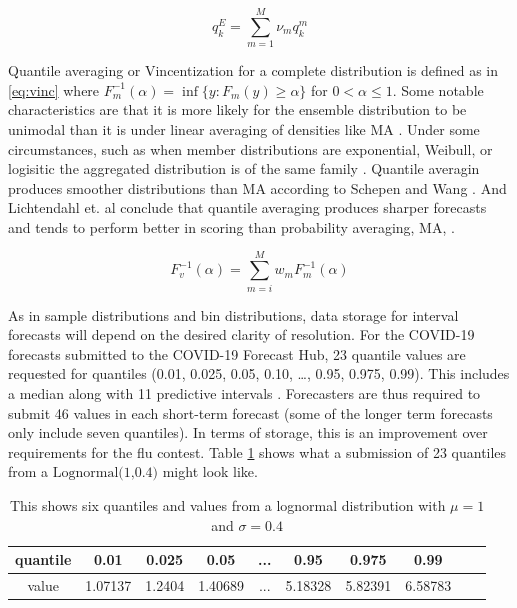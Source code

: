 \documentclass[11pt,notitlepage]{isuthesis}
\begin{document}
\begin{equation}
\label{eq:qa}
  q^E_k = \sum_{m=1}^M \nu_m q_k^m 
\end{equation}



Quantile averaging or Vincentization for a complete distribution is defined as
in \eqref{eq:vinc}
where $F_m^{-1} (\alpha) = \inf \{y:F_m(y) \geq \alpha\}$ for 
$0 < \alpha \leq 1$. Some notable characteristics are that it is more likely for
the ensemble distribution
to be unimodal than it is under linear averaging of densities like MA 
\cite[]{busetti2017quantile}. Under some circumstances, such as when member
distributions are exponential, Weibull, or logisitic the aggregated distribution
is of the same family \cite[]{ratcliff1979group}. Quantile averagin produces 
smoother
distributions than MA according to Schepen and Wang \cite[]{schepen2015model}.
And Lichtendahl et. al conclude that quantile averaging produces sharper 
forecasts
and tends to perform better in scoring than probability averaging, MA,
\cite[]{lichtendahl2013better}.

\begin{equation}
\label{eq:vinc}
  F_v^{-1}(\alpha) = \sum_{m=i}^M w_m F_m^{-1} (\alpha)
\end{equation}


As in sample distributions and bin distributions, 
data storage for interval forecasts will
depend on the desired clarity of resolution. For the COVID-19 forecasts 
submitted to the COVID-19 Forecast Hub, 23 quantile values are requested for 
quantiles (0.01, 0.025, 0.05, 0.10, …, 0.95, 0.975, 0.99). This includes a 
median along with 11 predictive intervals \cite[]{bracher2021evaluating}. 
Forecasters are thus required to submit 46 values in each short-term forecast 
(some of the longer term forecasts only include seven quantiles). In terms of 
storage, this is an improvement over requirements for the flu contest. Table
\ref{table:qstor} shows what a submission of 23 quantiles from a 
$\mbox{Lognormal(1,0.4)}$ might look like.



\begin{table}[h!]
\centering
\begin{center}

\captionsetup{font=scriptsize}

 \begin{tabular}{|c||c|c|c|c|c|c|c|c|c|}
 \hline
    quantile & 0.01 & 0.025 & 0.05  & ...  & 0.95 & 0.975 & 0.99 \\ \hline
    value & 1.07137 & 1.2404 & 1.40689 & ... & 5.18328 &
    5.82391 & 6.58783 \\
    
 \hline
 \end{tabular}
 \begin{minipage}{10cm}
 \caption[Quantiles and values storage]{This shows six quantiles
 and values from a lognormal distribution with $\mu = 1$ and $\sigma = 0.4$}
 \label{table:qstor}
 \end{minipage}
 \end{center}
\end{table}
\end{document}
